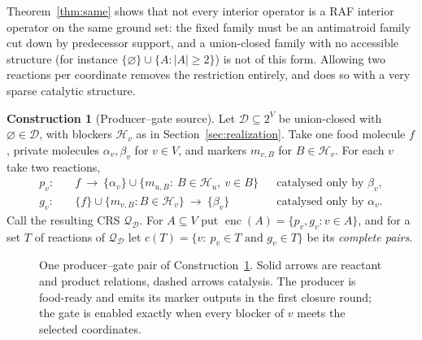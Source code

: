 \documentclass[11pt,a4paper]{article}
\theoremstyle{plain}
\theoremstyle{definition}
\newtheorem{construction}[theorem]{Construction}
\theoremstyle{remark}
\newcommand{\DD}{\mathcal D}
\newcommand{\HH}{\mathcal H}
\newcommand{\QQ}{\mathcal Q}
\newcommand{\enc}{\operatorname{enc}}
\begin{document}
Theorem~\ref{thm:same} shows that not every interior operator is a RAF interior operator on
the same ground set: the fixed family must be an antimatroid family cut down by predecessor
support, and a union-closed family with no accessible structure (for instance
$\{\varnothing\}\cup\{A:|A|\ge2\}$) is not of this form. Allowing two reactions per coordinate
removes the restriction entirely, and does so with a very sparse catalytic structure.

\begin{construction}[Producer--gate source]\label{con:pair}
Let $\DD\subseteq2^V$ be union-closed with $\varnothing\in\DD$, with blockers $\HH_v$ as in
Section~\ref{sec:realization}. Take one food molecule $f$, private molecules
$\alpha_v,\beta_v$ for $v\in V$, and markers $m_{v,B}$ for $B\in\HH_v$. For each $v$ take two
reactions,
\begin{align}
p_v:&\quad f\ \longrightarrow\ \{\alpha_v\}\cup\{m_{u,B}:\ B\in\HH_u,\ v\in B\} &&\text{catalysed only by }\beta_v,\label{eq:producer}\\
g_v:&\quad \{f\}\cup\{m_{v,B}:B\in\HH_v\}\ \longrightarrow\ \{\beta_v\} &&\text{catalysed only by }\alpha_v.\label{eq:gate}
\end{align}
Call the resulting CRS $\QQ_\DD$. For $A\subseteq V$ put $\enc(A)=\{p_v,g_v:v\in A\}$, and for
a set $T$ of reactions of $\QQ_\DD$ let $c(T)=\{v:\ p_v\in T\text{ and }g_v\in T\}$ be its
\emph{complete pairs}.
\end{construction}

\begin{figure}[tb]\centering
{}
\caption{One producer--gate pair of Construction~\ref{con:pair}. Solid arrows are reactant and product relations, dashed arrows catalysis. The producer is food-ready and emits its marker outputs in the first closure round; the gate is enabled exactly when every blocker of $v$ meets the selected coordinates.}
\label{fig:pair}
\end{figure}
\end{document}
